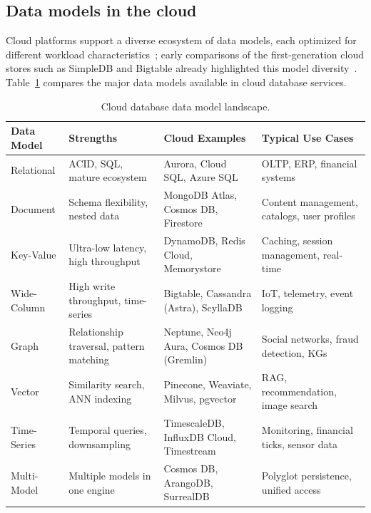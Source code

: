 \documentclass[a4paper,fleqn]{cas-sc}
\begin{document}
\subsection{Data models in the cloud}
\label{subsec:datamodels}

Cloud platforms support a diverse ecosystem of data models, each optimized for different workload characteristics~\cite{Gessert2016NoSQL,Khasawneh2020SQLNewSQL,Han2011NoSQL,Tudorica2011NoSQLCmp,Bader2017TSDB}; early comparisons of the first-generation cloud stores such as SimpleDB and Bigtable already highlighted this model diversity~\cite{Ramanathan2011SimpleDBBigtable}. Table~\ref{tab:datamodels} compares the major data models available in cloud database services.

\begin{table}[H]
\centering
\caption{Cloud database data model landscape.}
\label{tab:datamodels}
\small
\begin{tabular}{p{2cm} p{2.5cm} p{3cm} p{4cm}}
\toprule
\textbf{Data Model} & \textbf{Strengths} & \textbf{Cloud Examples} & \textbf{Typical Use Cases} \\
\midrule
Relational & ACID, SQL, mature ecosystem & Aurora, Cloud SQL, Azure SQL & OLTP, ERP, financial systems \\
\addlinespace
Document & Schema flexibility, nested data & MongoDB Atlas, Cosmos DB, Firestore & Content management, catalogs, user profiles \\
\addlinespace
Key-Value & Ultra-low latency, high throughput & DynamoDB, Redis Cloud, Memorystore & Caching, session management, real-time \\
\addlinespace
Wide-Column & High write throughput, time-series & Bigtable, Cassandra (Astra), ScyllaDB & IoT, telemetry, event logging \\
\addlinespace
Graph & Relationship traversal, pattern matching & Neptune, Neo4j Aura, Cosmos DB (Gremlin) & Social networks, fraud detection, KGs \\
\addlinespace
Vector & Similarity search, ANN indexing & Pinecone, Weaviate, Milvus, pgvector & RAG, recommendation, image search \\
\addlinespace
Time-Series & Temporal queries, downsampling & TimescaleDB, InfluxDB Cloud, Timestream & Monitoring, financial ticks, sensor data \\
\addlinespace
Multi-Model & Multiple models in one engine & Cosmos DB, ArangoDB, SurrealDB & Polyglot persistence, unified access \\
\bottomrule
\end{tabular}
\end{table}
\end{document}
